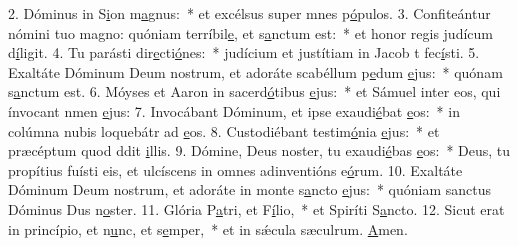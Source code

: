 2. Dóminus in S\uline{i}on m\uline{a}gnus:~* et excélsus super mnes p\uline{ó}pulos.
3. Confiteántur nómini tuo magno: quóniam terríbil\uline{e}, et s\uline{a}nctum est:~* et honor regis judícum d\uline{í}ligit.
4. Tu parásti dir\uline{e}cti\uline{ó}nes:~* judícium et justítiam in Jacob t fec\uline{í}sti.
5. Exaltáte Dóminum Deum nostrum, et adoráte scabéllum p\uline{e}dum \uline{e}jus:~* quónam s\uline{a}nctum est.
6. Móyses et Aaron in sacerd\uline{ó}tibus \uline{e}jus:~* et Sámuel inter eos, qui ínvocant nmen \uline{e}jus:
7. Invocábant Dóminum, et ipse exaudi\uline{é}bat \uline{e}os:~* in colúmna nubis loquebátr ad \uline{e}os.
8. Custodiébant testim\uline{ó}nia \uline{e}jus:~* et præcéptum quod ddit \uline{i}llis.
9. Dómine, Deus noster, tu exaudi\uline{é}bas \uline{e}os:~* Deus, tu propítius fuísti eis, et ulcíscens in omnes adinventións e\uline{ó}rum.
10. Exaltáte Dóminum Deum nostrum, et adoráte in monte s\uline{a}ncto \uline{e}jus:~* quóniam sanctus Dóminus Dus n\uline{o}ster.
11. Glória P\uline{a}tri, et F\uline{í}lio,~* et Spiríti S\uline{a}ncto.
12. Sicut erat in princípio, et n\uline{u}nc, et s\uline{e}mper,~* et in sǽcula sæculrum. \uline{A}men.
